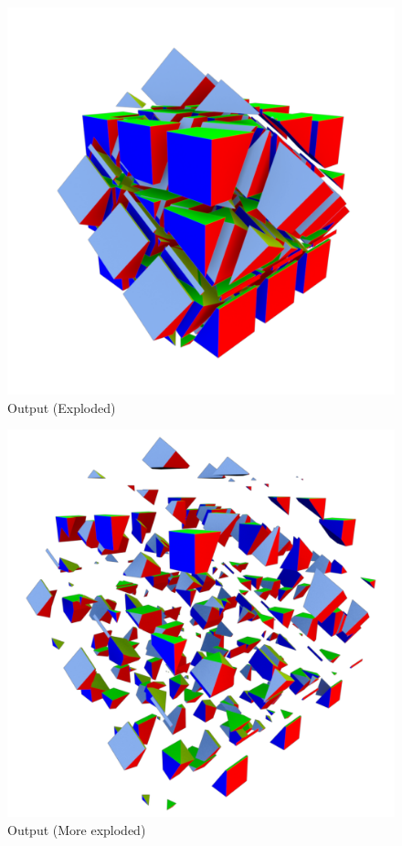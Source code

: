 \begin{figure}[h]
    \includegraphics[width=\textwidth]{./img/test-1.pdf}%
    \caption{Output (Exploded)}
\end{figure}

\begin{figure}[h]
    \includegraphics[width=\textwidth]{./img/test-2.pdf}%
    \caption{Output (More exploded)}
\end{figure}